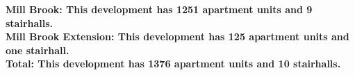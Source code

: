 \bf{Mill Brook}: This development has 1251 apartment units and 9 stairhalls.\\\bf{Mill Brook Extension}: This development has 125 apartment units and one stairhall.\\\bf{Total}: This development has 1376 apartment units and 10 stairhalls.\\